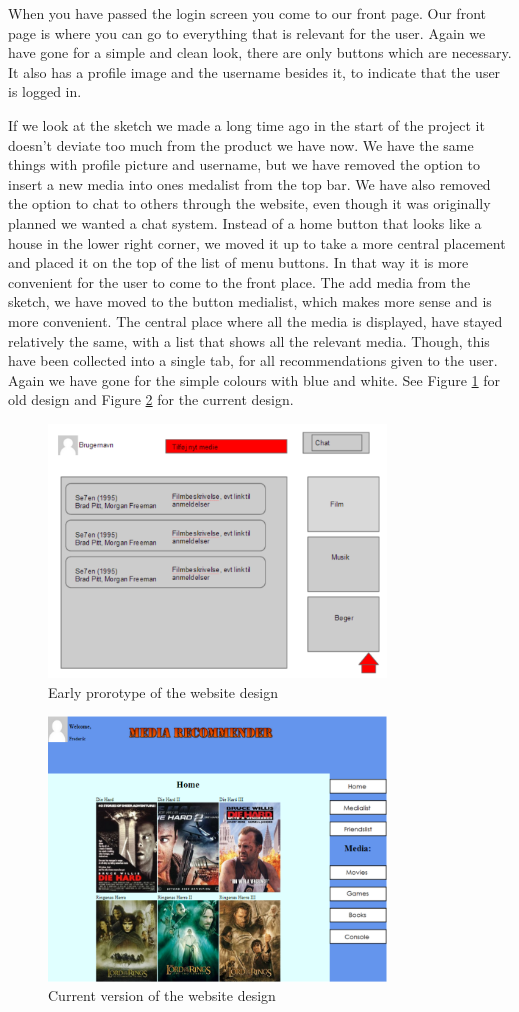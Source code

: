 When you have passed the login screen you come to our front page. Our front page is where you can go to everything that is relevant for the user. Again we have gone for a simple and clean look, there are only buttons which are necessary. It also has a profile image and the username besides it, to indicate that the user is logged in.

If we look at the sketch we made a long time ago in the start of the project it doesn't deviate too much from the product we have now. We have the same things with profile picture and username, but we have removed the option to insert a new media into ones medalist from the top bar. We have also removed the option to chat to others through the website, even though it was originally planned we wanted a chat system.
Instead of a home button that looks like a house in the lower right corner, we moved it up to take a more central placement and placed it on the top of the list of menu buttons. In that way it is more convenient for the user to come to the front place. The add media from the sketch, we have moved to the button medialist, which makes more sense and is more convenient. The central place where all the media is displayed, have stayed relatively the same, with a list that shows all the relevant media. Though, this have been collected into a single tab, for all recommendations given to the user. Again we have gone for the simple colours with blue and white. See Figure \ref{OldSite} for old design and Figure \ref{CurrSite} for the current design.

\begin{figure}[htb]
\centering
\includegraphics[width=0.8\textwidth]{Images/OldSite.png}
\caption{Early prorotype of the website design}
\label{OldSite}
\end{figure}


\begin{figure}[htb]
\centering
\includegraphics[width=0.8\textwidth]{Images/CurrSite.png}
\caption{Current version of the website design}
\label{CurrSite}
\end{figure}